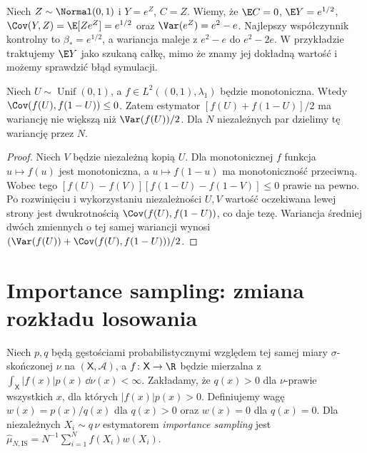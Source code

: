 \begin{przyklad}
Niech $Z\sim\Normal(0,1)$ i
$Y=e^Z$, $C=Z$. Wiemy, że $\E C=0$,
$\E Y=e^{1/2}$, $\Cov(Y,Z)=\E[Ze^Z]=e^{1/2}$
oraz $\Var(e^Z)=e^2-e$.
Najlepszy współczynnik kontrolny to $\beta_*=e^{1/2}$,
a wariancja maleje z $e^2-e$ do $e^2-2e$.
W przykładzie traktujemy $\E Y$ jako szukaną całkę,
mimo że znamy jej dokładną wartość i możemy sprawdzić błąd symulacji.
\end{przyklad}

\begin{stwierdzenie}
\label{prop:antithetic}
Niech $U\sim\operatorname{Unif}(0,1)$, a
$f\in L^2((0,1),\lambda_1)$ będzie monotoniczna.
Wtedy $\Cov(f(U),f(1-U))\le0$.
Zatem estymator $[f(U)+f(1-U)]/2$ ma wariancję
nie większą niż $\Var(f(U))/2$.
Dla $N$ niezależnych par dzielimy tę wariancję przez $N$.
\end{stwierdzenie}
\begin{proof}
Niech $V$ będzie niezależną kopią $U$. Dla monotonicznej
$f$ funkcja $u\mapsto f(u)$ jest monotoniczna, a
$u\mapsto f(1-u)$ ma monotoniczność przeciwną.
Wobec tego
$[f(U)-f(V)][f(1-U)-f(1-V)]\le0$ prawie na pewno.
Po rozwinięciu i wykorzystaniu niezależności $U,V$
wartość oczekiwana lewej strony jest dwukrotnością
$\Cov(f(U),f(1-U))$, co daje tezę.
Wariancja średniej dwóch zmiennych o tej samej wariancji
wynosi $(\Var(f(U))+\Cov(f(U),f(1-U)))/2$.
\end{proof}

\section{Importance sampling: zmiana rozkładu losowania}
\begin{definicja}
\label{def:importance-sampling}
Niech $p,q$ będą gęstościami probabilistycznymi względem
tej samej miary $\sigma$-skończonej $\nu$ na $(\mathsf X,\mathcal A)$,
a $f\colon\mathsf X\to\R$ będzie mierzalna z
$\int_{\mathsf X}|f(x)|p(x)\,\dd\nu(x)<\infty$.
Zakładamy, że $q(x)>0$ dla $\nu$-prawie wszystkich $x$,
dla których $|f(x)|p(x)>0$. Definiujemy wagę
$w(x)=p(x)/q(x)$ dla $q(x)>0$ oraz $w(x)=0$ dla $q(x)=0$.
Dla niezależnych $X_i\sim q\,\nu$ estymatorem \emph{importance sampling}
jest $\widehat\mu_{N,\mathrm{IS}}=N^{-1}\sum_{i=1}^N f(X_i)w(X_i)$.
\end{definicja}


